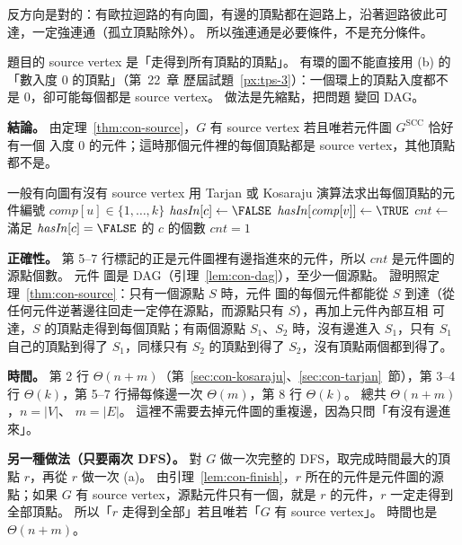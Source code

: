 反方向是對的：有歐拉迴路的有向圖，有邊的頂點都在迴路上，沿著迴路彼此可達，一定強連通（孤立頂點除外）。
所以強連通是必要條件，不是充分條件。

題目的 source vertex 是「走得到所有頂點的頂點」。 有環的圖不能直接用 (b) 的「數入度 $0$ 的頂點」（第~22~章
歷屆試題~\ref{px:tps-3}）：一個環上的頂點入度都不是 $0$，卻可能每個都是 source vertex。 做法是先縮點，把問題
變回 DAG。

\textbf{結論。} 由定理~\ref{thm:con-source}，$G$ 有 source vertex 若且唯若元件圖 $G^{\mathrm{SCC}}$ 恰好有一個
入度 $0$ 的元件；這時那個元件裡的每個頂點都是 source vertex，其他頂點都不是。

\begin{pseudo}[label=alg:con-px-source]{一般有向圖有沒有 source vertex}
    \State 用 Tarjan 或 Kosaraju 演算法求出每個頂點的元件編號 $\mathit{comp}[u] \in \{1, \ldots, k\}$
        \State $\mathit{hasIn}[c] \gets \FALSE$
    \EndFor
            \State $\mathit{hasIn}[\mathit{comp}[v]] \gets \TRUE$
        \EndIf
    \EndFor
    \State $\mathit{cnt} \gets$ 滿足 $\mathit{hasIn}[c] = \FALSE$ 的 $c$ 的個數
    \State \Return $\mathit{cnt} = 1$
\EndFunction
\end{pseudo}

\textbf{正確性。} 第 5--7 行標記的正是元件圖裡有邊指進來的元件，所以 $\mathit{cnt}$ 是元件圖的源點個數。 元件
圖是 DAG（引理~\ref{lem:con-dag}），至少一個源點。 證明照定理~\ref{thm:con-source}：只有一個源點 $S$ 時，元件
圖的每個元件都能從 $S$ 到達（從任何元件逆著邊往回走一定停在源點，而源點只有 $S$），再加上元件內部互相
可達，$S$ 的頂點走得到每個頂點；有兩個源點 $S_1$、$S_2$ 時，沒有邊進入 $S_1$，只有 $S_1$ 自己的頂點到得了
$S_1$，同樣只有 $S_2$ 的頂點到得了 $S_2$，沒有頂點兩個都到得了。

\textbf{時間。} 第 2 行 $\Theta(n + m)$（第~\ref{sec:con-kosaraju}、\ref{sec:con-tarjan}~節），第 3--4 行
$\Theta(k)$，第 5--7 行掃每條邊一次 $\Theta(m)$，第 8 行 $\Theta(k)$。 總共 $\Theta(n + m)$，$n = |V|$、
$m = |E|$。 這裡不需要去掉元件圖的重複邊，因為只問「有沒有邊進來」。

\textbf{另一種做法（只要兩次 DFS）。} 對 $G$ 做一次完整的 DFS，取完成時間最大的頂點 $r$，再從 $r$ 做一次 (a)。
由引理~\ref{lem:con-finish}，$r$ 所在的元件是元件圖的源點；如果 $G$ 有 source vertex，源點元件只有一個，就是
$r$ 的元件，$r$ 一定走得到全部頂點。 所以「$r$ 走得到全部」若且唯若「$G$ 有 source vertex」。 時間也是
$\Theta(n + m)$。

